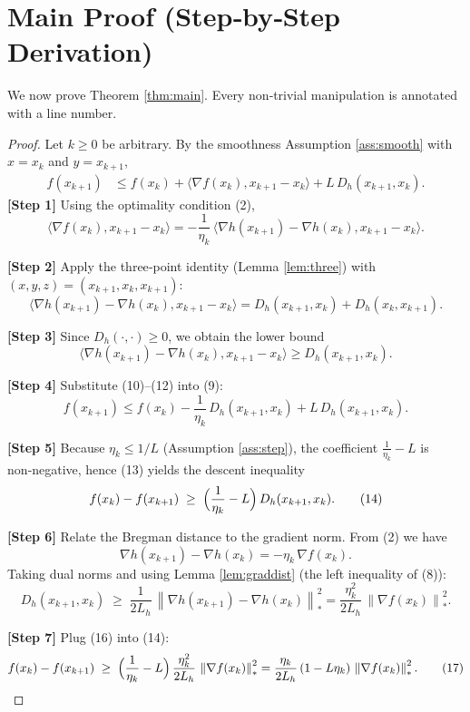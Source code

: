\documentclass{article}
\newcommand{\dualnorm}[1]{\left\lVert#1\right\rVert_{*}}
\newcommand{\inner}[2]{\langle #1,#2\rangle}
\newcommand{\D}[2]{D_{h}(#1,#2)}
\begin{document}
\section*{Main Proof (Step‑by‑Step Derivation)}
We now prove Theorem \ref{thm:main}.  Every non‑trivial manipulation
is annotated with a line number.

\begin{proof}
Let $k\ge0$ be arbitrary. By the smoothness Assumption
\ref{ass:smooth} with $x=x_k$ and $y=x_{k+1}$,
\begin{align}
f(x_{k+1})
&\le f(x_k)+\inner{\nabla f(x_k)}{x_{k+1}-x_k}
   +L\,\D{x_{k+1}}{x_k}.
\tag{9}
\end{align}
\textbf{[Step 1]} Using the optimality condition (2),
\[
\inner{\nabla f(x_k)}{x_{k+1}-x_k}
= -\frac{1}{\eta_k}\,
   \inner{\nabla h(x_{k+1})-\nabla h(x_k)}{x_{k+1}-x_k}.
\tag{10}
\]

\textbf{[Step 2]} Apply the three‑point identity (Lemma \ref{lem:three})
with $(x,y,z)=(x_{k+1},x_k,x_{k+1})$:
\[
\inner{\nabla h(x_{k+1})-\nabla h(x_k)}{x_{k+1}-x_k}
= \D{x_{k+1}}{x_k}+ \D{x_k}{x_{k+1}}.
\tag{11}
\]

\textbf{[Step 3]} Since $D_h(\cdot,\cdot)\ge0$, we obtain the lower bound
\[
\inner{\nabla h(x_{k+1})-\nabla h(x_k)}{x_{k+1}-x_k}
\ge \D{x_{k+1}}{x_k}.
\tag{12}
\]

\textbf{[Step 4]} Substitute (10)–(12) into (9):
\[
f(x_{k+1})
\le f(x_k) -\frac{1}{\eta_k}\,\D{x_{k+1}}{x_k}
      +L\,\D{x_{k+1}}{x_k}.
\tag{13}
\]

\textbf{[Step 5]} Because $\eta_k\le 1/L$ (Assumption \ref{ass:step}),
the coefficient $ \frac{1}{\eta_k}-L$ is non‑negative, hence (13) yields
the descent inequality
\[
f(x_{k})-f(x_{k+1})
\;\ge\;
\Bigl(\frac{1}{\eta_k}-L\Bigr)\,\D{x_{k+1}}{x_k}.
\tag{14}
\]

\textbf{[Step 6]} Relate the Bregman distance to the gradient norm.
From (2) we have
\[
\nabla h(x_{k+1})-\nabla h(x_k) = -\eta_k\,\nabla f(x_k).
\tag{15}
\]
Taking dual norms and using Lemma \ref{lem:graddist} (the left inequality of (8)):
\[
\D{x_{k+1}}{x_k}
\;\ge\;
\frac{1}{2L_h}\,
\dualnorm{\nabla h(x_{k+1})-\nabla h(x_k)}^{2}
=
\frac{\eta_k^{2}}{2L_h}\,
\dualnorm{\nabla f(x_k)}^{2}.
\tag{16}
\]

\textbf{[Step 7]} Plug (16) into (14):
\[
f(x_k)-f(x_{k+1})
\;\ge\;
\Bigl(\frac{1}{\eta_k}-L\Bigr)\,
\frac{\eta_k^{2}}{2L_h}\,
\dualnorm{\nabla f(x_k)}^{2}
=
\frac{\eta_k}{2L_h}\,(1-L\eta_k)\,
\dualnorm{\nabla f(x_k)}^{2}.
\tag{17}
\]


\end{proof}
\end{document}
